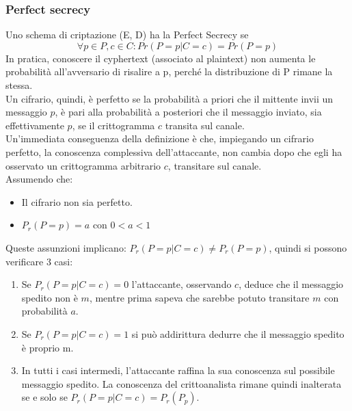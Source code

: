 \documentclass[a4paper,12pt]{article}
\begin{document}
\subsubsection{Perfect secrecy}
Uno schema di criptazione (E, D) ha la Perfect Secrecy se
$$ \forall p \in P, c \in C : Pr(P = p | C = c) = Pr(P = p) $$
In pratica, conoscere il cyphertext (associato al plaintext) non aumenta le probabilità all'avversario di risalire a p, perché la distribuzione di P rimane la stessa. \\
Un cifrario, quindi, è perfetto se la probabilità a priori che il mittente invii un messaggio $p$, è pari alla probabilità a posteriori che il messaggio inviato, sia effettivamente $p$, se il crittogramma $c$ transita sul canale. \\
Un'immediata conseguenza della definizione è che, impiegando un cifrario perfetto, la conoscenza complessiva dell'attaccante, non cambia dopo che egli ha osservato un crittogramma arbitrario $c$, transitare sul canale. \\
Assumendo che:
\begin{itemize}
	\item Il cifrario non sia perfetto.
	\item $P_r(P=p) = a$ con $0 < a < 1$
\end{itemize} 
Queste assunzioni implicano: $P_r(P=p | C=c) \neq P_r(P=p)$, quindi si possono verificare 3 casi:
\begin{enumerate}
	\item Se $P_r(P=p | C=c) = 0$ l'attaccante, osservando $c$, deduce che il messaggio spedito non è $m$, mentre prima sapeva che sarebbe potuto transitare $m$ con probabilità $a$.
	\item Se $P_r(P=p | C=c) = 1$ si può addirittura dedurre che il messaggio spedito è proprio m.
	\item In tutti i casi intermedi, l'attaccante raffina la sua conoscenza sul possibile messaggio spedito. La conoscenza del crittoanalista rimane quindi inalterata se e solo se $P_r(P=p | C=c) = P_r(P_p)$.
\end{enumerate}
\end{document}

